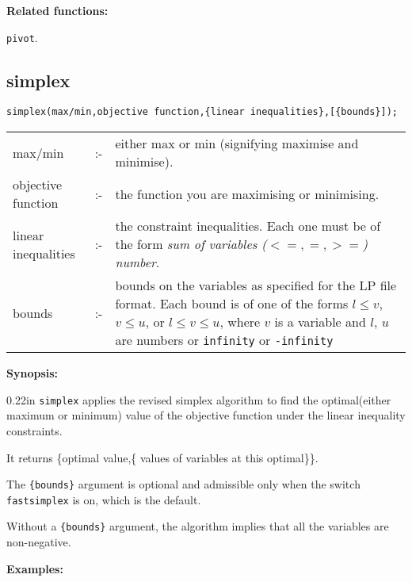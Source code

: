 {\bf Related functions:}

\hspace*{0.175in} {\tt pivot}.


\subsection{simplex}


\hspace*{0.175in} {\tt simplex(max/min,objective function,\{linear 
inequalities\},[\{bounds\}]);}

\hspace*{0.1in}  
\begin{tabular}{l l l} 
  max/min             & :- & \parbox[t]{.63\linewidth}{either max or min 
    (signifying maximise and minimise).} \\
  objective function  & :- & the function you are maximising or 
  minimising. \\
  linear inequalities & :- & \parbox[t]{.63\linewidth}{the constraint 
    inequalities. Each one must be of the form 
    {\it sum of variables ($<=,=,>=$) number}.}\\
  bounds & :- & \parbox[t]{.63\linewidth}{bounds on the variables as
    specified for the LP file format. Each bound is of one of the forms $l\leq
    v$, $v\leq u$, or $l\leq v\leq u$, where $v$ is a variable and $l$, $u$ are
    numbers or \texttt{infinity} or \texttt{-infinity}}
\end{tabular}

{\bf Synopsis:} %

\begin{addtolength}{\leftskip}{0.22in}
{\tt simplex} applies the revised simplex algorithm to find the 
optimal(either maximum or minimum) value of the objective function 
under the linear inequality constraints.

It returns \{optimal value,\{ values of variables at this optimal\}\}.

The \texttt{\{bounds\}} argument is optional and admissible only when the switch
\texttt{fastsimplex} is on, which is the default.

Without a \texttt{\{bounds\}} argument, the algorithm implies that all the
variables are non-negative.

\end{addtolength}

{\bf Examples:}

